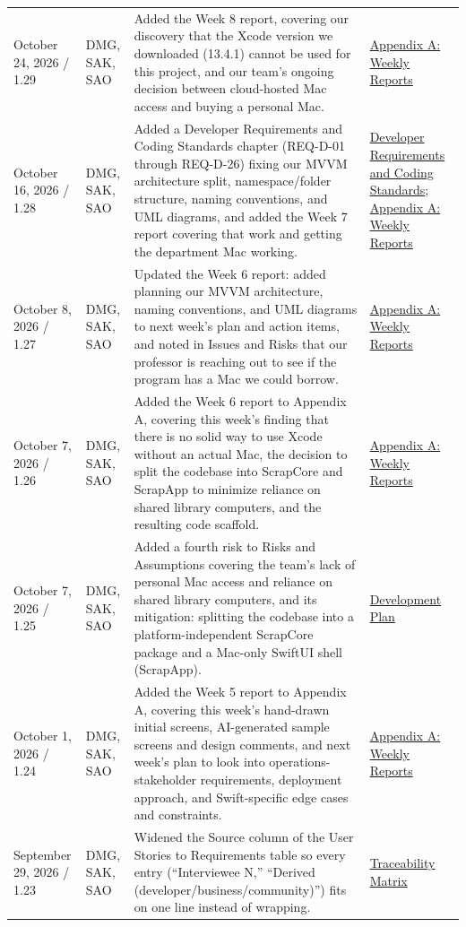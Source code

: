 \begin{tabularx}{\linewidth}{L{2.7cm}L{2.0cm}YL{2.4cm}}
October 24, 2026 / 1.29 & DMG, SAK, SAO & Added the Week 8 report, covering our discovery that the Xcode version we downloaded (13.4.1) cannot be used for this project, and our team's ongoing decision between cloud-hosted Mac access and buying a personal Mac. & \hyperref[Chapter:WeeklyReports]{Appendix A: Weekly Reports}\\
October 16, 2026 / 1.28 & DMG, SAK, SAO & Added a Developer Requirements and Coding Standards chapter (REQ-D-01 through REQ-D-26) fixing our MVVM architecture split, namespace/folder structure, naming conventions, and UML diagrams, and added the Week 7 report covering that work and getting the department Mac working. & \hyperref[Chapter:DeveloperRequirements]{Developer Requirements and Coding Standards}; \hyperref[Chapter:WeeklyReports]{Appendix A: Weekly Reports}\\
October 8, 2026 / 1.27 & DMG, SAK, SAO & Updated the Week 6 report: added planning our MVVM architecture, naming conventions, and UML diagrams to next week's plan and action items, and noted in Issues and Risks that our professor is reaching out to see if the program has a Mac we could borrow. & \hyperref[Chapter:WeeklyReports]{Appendix A: Weekly Reports}\\
October 7, 2026 / 1.26 & DMG, SAK, SAO & Added the Week 6 report to Appendix A, covering this week's finding that there is no solid way to use Xcode without an actual Mac, the decision to split the codebase into ScrapCore and ScrapApp to minimize reliance on shared library computers, and the resulting code scaffold. & \hyperref[Chapter:WeeklyReports]{Appendix A: Weekly Reports}\\
October 7, 2026 / 1.25 & DMG, SAK, SAO & Added a fourth risk to Risks and Assumptions covering the team's lack of personal Mac access and reliance on shared library computers, and its mitigation: splitting the codebase into a platform-independent ScrapCore package and a Mac-only SwiftUI shell (ScrapApp). & \hyperref[Chapter:DevelopmentPlan]{Development Plan}\\
October 1, 2026 / 1.24 & DMG, SAK, SAO & Added the Week 5 report to Appendix A, covering this week's hand-drawn initial screens, AI-generated sample screens and design comments, and next week's plan to look into operations-stakeholder requirements, deployment approach, and Swift-specific edge cases and constraints. & \hyperref[Chapter:WeeklyReports]{Appendix A: Weekly Reports}\\
September 29, 2026 / 1.23 & DMG, SAK, SAO & Widened the Source column of the User Stories to Requirements table so every entry (``Interviewee N,'' ``Derived (developer/business/community)'') fits on one line instead of wrapping. & \hyperref[Chapter:Traceability]{Traceability Matrix}\\

\end{tabularx}
